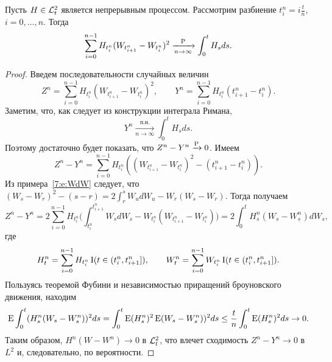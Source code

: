 \begin{lemma}
\label{7:l:p-convergence}
Пусть $H\in \L^2_t$ является непрерывным процессом.
Рассмотрим разбиение $t_i^n = i\frac tn$, $i=0,\dots,n$. 
Тогда
\[
\sum_{i=0}^{n-1} H_{t_i^n}(W_{t_{i+1}^n}-W_{t_i^n})^2 \xrightarrow[n\to\infty]{\P} \int_0^t H_s ds.
\]
\end{lemma}

\begin{proof}
Введем последовательности случайных величин 
\[
Z^n = \sum_{i=0}^{n-1} H_{t_i^n}(W_{t_{i+1}^n}-W_{t_i^n})^2,\qquad
Y^n = \sum_{i=0}^{n-1} H_{t_i^n}(t_{i+1}^n- t_i^n).
\]
Заметим, что, как следует из конструкции интеграла Римана,
\[
Y^n \xrightarrow[n\to\infty]{\text{п.н.}} \int_0^t H_s ds.
\]
Поэтому достаточно будет показать, что $Z^n-Y^n \xrightarrow{\P} 0$.
Имеем
\[
Z^n-Y^n = \sum_{i=0}^{n-1} H_{t_i^n}((W_{t_{i+1}^n} - W_{t_i^n})^2 - (t_{i+1}^n - t_i^n)).
\]
Из примера~\ref{7:e:WdW} следует, что $(W_s-W_r)^2 - (s-r) = 2\int_r^s W_u dW_u - W_r(W_s-W_r)$. 
Тогда получаем
\[
Z^n - Y^n 
= 2\sum_{i=0}^{n-1} H_{t_i^n} \biggl(
  \int_{t_i^n}^{t_{i+1}^n} W_s dW_s - W_{t_i^n}(W_{t^n_{i+1}}-W_{t_i^n})
\biggr) 
= 2\int_0^t H^n_s(W_s-W^n_s) dW_s,
\]
где
\[
H^n_t = \sum_{i=0}^{n-1} H_{t_i^n} \I(t\in(t_i^n,t_{i+1}^n]), \qquad
W^n_t = \sum_{i=0}^{n-1} W_{t_i^n} \I(t\in (t_i^n,t_{i+1}^n]).
\]
Пользуясь теоремой Фубини и независимостью приращений броуновского движения, находим
\[
\E \int_0^t (H_s^n (W_s - W_s^n))^2 ds = \int_0^t \E (H_s^n)^2 \E(W_s - W_s^n))^2 ds \\
\le \frac tn \int_0^t \E (H_s^n)^2 ds \to 0.
\]
Таким образом, $H^n(W-W^n) \to 0$ в $\L^2_t$, что влечет сходимость $Z^n-Y^n \to 0$ в $L^2$ и, следовательно, по вероятности.
\end{proof}

